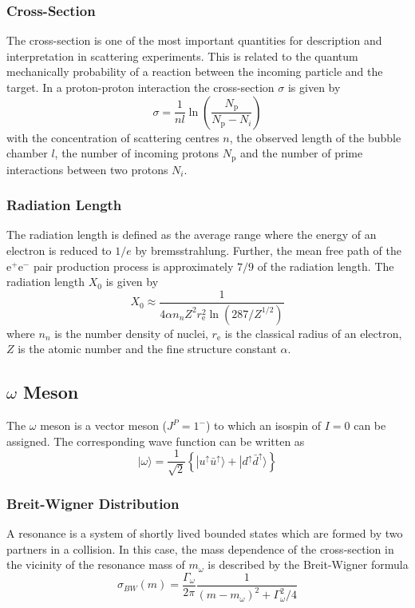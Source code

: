 \documentclass[10pt, a4paper, notitlepage, DIV=15]{scrartcl}
\begin{document}
\subsubsection{Cross-Section}
 The cross-section is one of the most important quantities for description and interpretation in scattering experiments. This is related to the quantum mechanically probability of a reaction between the incoming particle and the target. In a proton-proton interaction the cross-section $\sigma$ is given by \cite{description}
 \begin{equation}
 	\sigma=\frac{1}{nl}\ln\left(\frac{N_\text{p}}{N_\text{p}-N_i} \right) 
 \end{equation}
 with the concentration of scattering centres $n$, the observed length of the bubble chamber $l$, the number of incoming protons $N_\text{p}$ and the number of prime interactions between two protons $N_i$. \cite{martin}
\subsubsection{Radiation Length}
The radiation length is defined as the average range where the energy of an electron is reduced to $1/e$ by bremsstrahlung. Further, the mean free path of the e$^+$e$^-$ pair production process is approximately $7/9$ of the radiation length. The radiation length $X_0$ is given by \cite{thomson}
\begin{equation}
	X_0\approx\frac{1}{4\alpha n_n Z^2r_\text{e}^2\ln\left(287/Z^{1/2} \right) }
\end{equation}
where $n_n$ is the number density of nuclei, $r_\text{e}$ is the classical radius of an electron, $Z$ is the atomic number and the fine structure constant $\alpha$. \cite{thomson}
\subsection{$\omega$ Meson}
The $\omega$ meson is a vector meson ($J^P=1^-$) to which an isospin of $I=0$ can be assigned. The corresponding wave function can be written as \cite{povh}
\begin{equation}
	|\omega \rangle = \frac{1}{\sqrt{2}}\left\lbrace|u^\uparrow \bar{u}^\uparrow \rangle + |d^\uparrow \bar{d}^\uparrow \rangle\right\rbrace 
\end{equation}
\subsubsection{Breit-Wigner Distribution}
A resonance is a system of shortly lived bounded states which are formed by two partners in a collision. In this case, the mass dependence of the cross-section in the vicinity of the resonance mass of  $m_\omega$ is described by the Breit-Wigner formula \cite{description}
\begin{equation} \label{eq:bw}
	\sigma_{BW}(m)=  \frac{\Gamma_\omega}{2\pi}\frac{1}{(m-m_\omega)^2+\Gamma_\omega^2/4}
\end{equation}
\end{document}
